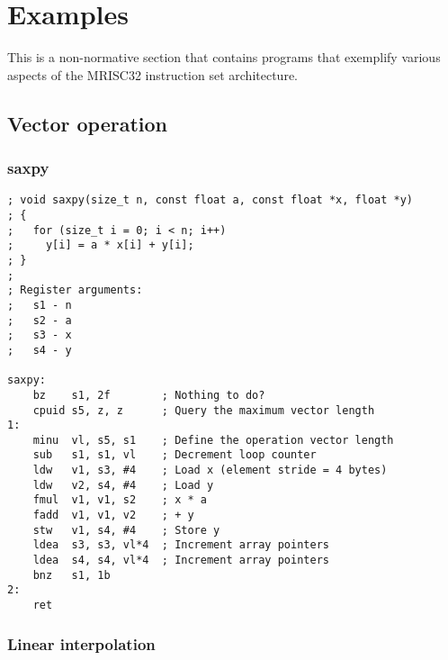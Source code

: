 %

\onecolumn

\chapter{Examples}

This is a non-normative section that contains programs that exemplify various
aspects of the MRISC32 instruction set architecture.

\section{Vector operation}

\subsection{saxpy}

\begin{lstlisting}[style=assembler]
; void saxpy(size_t n, const float a, const float *x, float *y)
; {
;   for (size_t i = 0; i < n; i++)
;     y[i] = a * x[i] + y[i];
; }
;
; Register arguments:
;   s1 - n
;   s2 - a
;   s3 - x
;   s4 - y

saxpy:
    bz    s1, 2f        ; Nothing to do?
    cpuid s5, z, z      ; Query the maximum vector length
1:
    minu  vl, s5, s1    ; Define the operation vector length
    sub   s1, s1, vl    ; Decrement loop counter
    ldw   v1, s3, #4    ; Load x (element stride = 4 bytes)
    ldw   v2, s4, #4    ; Load y
    fmul  v1, v1, s2    ; x * a
    fadd  v1, v1, v2    ; + y
    stw   v1, s4, #4    ; Store y
    ldea  s3, s3, vl*4  ; Increment array pointers
    ldea  s4, s4, vl*4  ; Increment array pointers
    bnz   s1, 1b
2:
    ret
\end{lstlisting}

\subsection{Linear interpolation}

